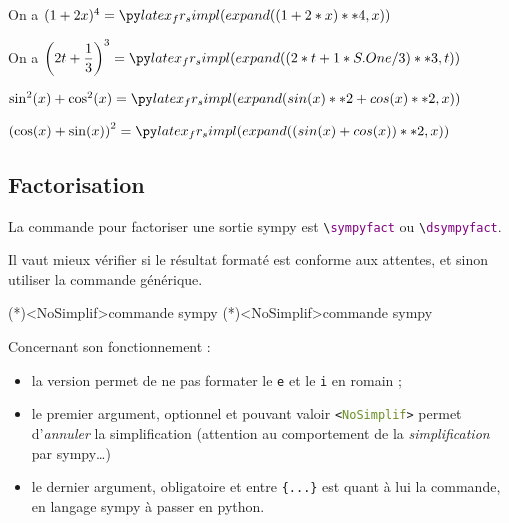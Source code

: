 \documentclass[french,a4paper,11pt]{article}
\newcommand\Cle[1]{{\bfseries\sffamily\textlangle #1\textrangle}}
\begin{document}
\begin{bloctext}
On a $(1+2x)^4 = \sympydev{(1+2*x)**4}$

On a $\left(2t+\dfrac13\right)^3 = \dsympydev{(2*t+1/3)**3}[t]$
\end{bloctext}

\begin{bloctext}
$\sin^2(x)+\cos^2(x) = \dsympydev{sin(x)**2+cos(x)**2}$

$\left(\cos(x)+\sin(x)\right)^2 = \dsympydev{(sin(x)+cos(x))**2}$
\end{bloctext}

\subsection{Factorisation}

\begin{cautionblock}
La commande pour factoriser une sortie \textsf{sympy} est \texttt{\textbackslash \textcolor{purple}{sympyfact}} ou \texttt{\textbackslash \textcolor{purple}{dsympyfact}}.

Il vaut mieux vérifier si le résultat formaté est conforme aux attentes, et sinon utiliser la commande générique.
\end{cautionblock}

\begin{bloctext}
\sympyfact(*)<NoSimplif>{commande sympy}
\dsympyfact(*)<NoSimplif>{commande sympy}
\end{bloctext}

\begin{tipblock}
Concernant son fonctionnement :

\begin{itemize}
	\item la version \Cle{*} permet de ne pas formater le \texttt{e} et le \texttt{i} en \textsf{romain} ;
	\item le premier argument, optionnel et pouvant valoir \texttt{<\textcolor{OliveDrab}{NoSimplif}>} permet d'\textit{annuler} la simplification (attention au comportement de la \textit{simplification} par \textsf{sympy}\ldots)
	\item le dernier argument, obligatoire et entre \texttt{\{...\}} est quant à lui la commande, en langage \textsf{sympy} à passer en \textsf{python}.
\end{itemize}
\vspace*{-\baselineskip}\leavevmode
\end{tipblock}
\end{document}
